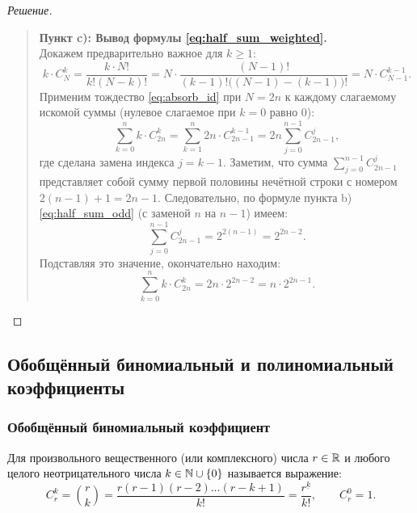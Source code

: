 \begin{proof}[Решение]
\begin{quote}
        \textbf{Пункт c): Вывод формулы \eqref{eq:half_sum_weighted}.}\\
        Докажем предварительно важное  для 
        $k \ge 1$:
        \begin{equation} \label{eq:absorb_id}
            k \cdot C_N^k = \frac{k \cdot N!}{k!(N - k)!} = 
            N \cdot \frac{(N - 1)!}{(k - 1)!\bigl((N - 1) - (k - 1)\bigr)!} = 
            N \cdot C_{N-1}^{k-1}. \tag{13}
        \end{equation}
        Применим тождество \eqref{eq:absorb_id} при $N = 2n$ к каждому 
        слагаемому искомой суммы (нулевое слагаемое при $k = 0$ равно $0$):
        \[
            \sum_{k=0}^{n} k \cdot C_{2n}^k = 
            \sum_{k=1}^{n} 2n \cdot C_{2n-1}^{k-1} = 
            2n \sum_{j=0}^{n-1} C_{2n-1}^j,
        \]
        где сделана замена индекса $j = k - 1$. Заметим, что сумма 
        $\sum_{j=0}^{n-1} C_{2n-1}^j$ представляет собой сумму первой 
        половины нечётной строки с номером $2(n - 1) + 1 = 2n - 1$. 
        Следовательно, по формуле пункта b) \eqref{eq:half_sum_odd} (с 
        заменой $n$ на $n - 1$) имеем:
        \[
            \sum_{j=0}^{n-1} C_{2n-1}^j = 2^{2(n-1)} = 2^{2n-2}.
        \]
        Подставляя это значение, окончательно находим:
        \[
            \sum_{k=0}^{n} k \cdot C_{2n}^k = 2n \cdot 2^{2n-2} = 
            n \cdot 2^{2n-1}.
        \]
    \end{quote}
\end{proof}

\subsection{Обобщённый биномиальный и полиномиальный коэффициенты}

\subsubsection{Обобщённый биномиальный коэффициент}

\begin{definition}
    Для произвольного вещественного (или комплексного) числа $r \in \mathbb{R}$ и 
    любого целого неотрицательного числа $k \in \mathbb{N} \cup \{0\}$ 
     называется выражение:
    \begin{equation} \label{eq:gen_binom_def}
        C_r^k = \binom{r}{k} = 
        \frac{r(r - 1)(r - 2) \dots (r - k + 1)}{k!} = 
        \frac{r^{\underline{k}}}{k!}, \qquad C_r^0 = 1. \tag{14}
    \end{equation}
\end{definition}


